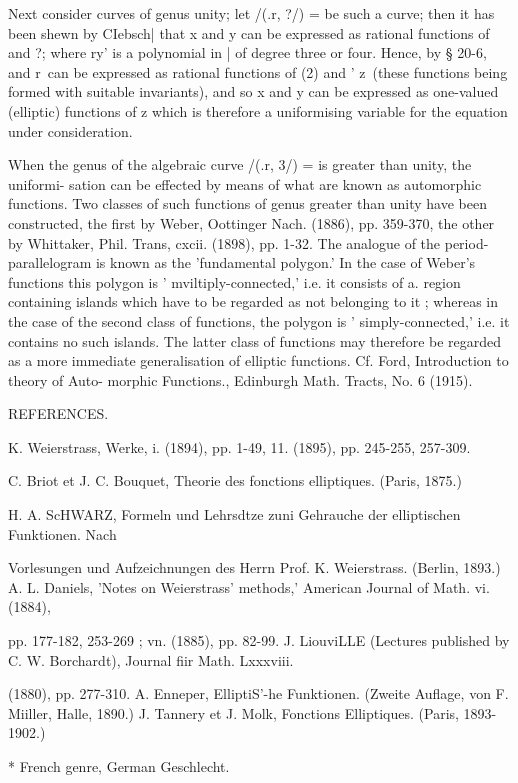 {Next consider curves of genus unity; let /(.r, ?/) = be such a curve;
then it has been shewn by CIebsch| that x and y can be expressed as
rational functions of and ?; where ry' is a polynomial in | of degree
three or four. Hence, by § 20-6, and r\ can be expressed as rational
functions of (2) and ' z\ (these functions being formed with suitable
invariants), and so x and y can be expressed as one-valued (elliptic)
functions of z which is therefore a uniformising variable for the
equation under consideration.

When the genus of the algebraic curve /(.r, 3/) = is greater than
unity, the uniformi- sation can be effected by means of what are known
as automorphic functions. Two classes of such functions of genus
greater than unity have been constructed, the first by Weber,
Oottinger Nach. (1886), pp. 359-370, the other by Whittaker, Phil.
Trans, cxcii. (1898), pp. 1-32. The analogue of the
period-parallelogram is known as the 'fundamental polygon.' In the
case of Weber's functions this polygon is ' mviltiply-connected,' i.e.
it consists of a. region containing islands which have to be regarded
as not belonging to it ; whereas in the case of the second class of
functions, the polygon is ' simply-connected,' i.e. it contains no
such islands. The latter class of functions may therefore be regarded
as a more immediate generalisation of elliptic functions. Cf. Ford,
Introduction to theory of Auto- morphic Functions., Edinburgh Math.
Tracts, No. 6 (1915).

REFERENCES.

K. Weierstrass, Werke, i. (1894), pp. 1-49, 11. (1895), pp. 245-255,
257-309.

C. Briot et J. C. Bouquet, Theorie des fonctions elliptiques. (Paris,
1875.)

H. A. ScHWARZ, Formeln und Lehrsdtze zuni Gehrauche der elliptischen
Funktionen. Nach

Vorlesungen und Aufzeichnungen des Herrn Prof. K. Weierstrass.
(Berlin, 1893.) A. L. Daniels, 'Notes on Weierstrass' methods,'
American Journal of Math. vi. (1884),

pp. 177-182, 253-269 ; vn. (1885), pp. 82-99. J. LiouviLLE (Lectures
published by C. W. Borchardt), Journal fiir Math. Lxxxviii.

(1880), pp. 277-310. A. Enneper, ElliptiS'-he Funktionen. (Zweite
Auflage, von F. Miiller, Halle, 1890.) J. Tannery et J. Molk,
Fonctions Elliptiques. (Paris, 1893-1902.)

* French genre, German Geschlecht.

}
